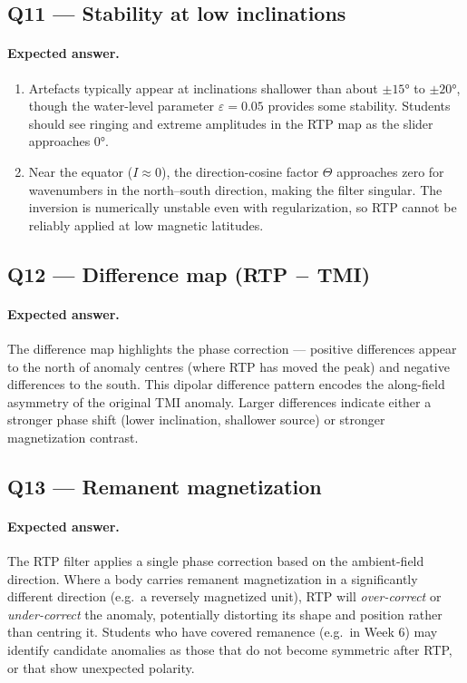 \documentclass[11pt]{article}
\begin{document}
\subsection*{Q11 — Stability at low inclinations}

\paragraph{Expected answer.}
\begin{enumerate}[label=\alph*.]
  \item Artefacts typically appear at inclinations shallower than about $\pm15°$
        to $\pm20°$, though the water-level parameter $\varepsilon = 0.05$
        provides some stability.  Students should see ringing and extreme
        amplitudes in the RTP map as the slider approaches $0°$.
  \item Near the equator ($I \approx 0$), the direction-cosine factor $\Theta$
        approaches zero for wavenumbers in the north--south direction, making the
        filter singular.  The inversion is numerically unstable even with
        regularization, so RTP cannot be reliably applied at low magnetic
        latitudes.
\end{enumerate}

\subsection*{Q12 — Difference map (RTP $-$ TMI)}

\paragraph{Expected answer.}
The difference map highlights the phase correction — positive differences appear
to the north of anomaly centres (where RTP has moved the peak) and negative
differences to the south.  This dipolar difference pattern encodes the along-field
asymmetry of the original TMI anomaly.  Larger differences indicate either a
stronger phase shift (lower inclination, shallower source) or stronger
magnetization contrast.

\subsection*{Q13 — Remanent magnetization}

\paragraph{Expected answer.}
The RTP filter applies a single phase correction based on the ambient-field
direction.  Where a body carries remanent magnetization in a significantly
different direction (e.g.\ a reversely magnetized unit), RTP will
\emph{over-correct} or \emph{under-correct} the anomaly, potentially distorting
its shape and position rather than centring it.  Students who have covered
remanence (e.g.\ in Week 6) may identify candidate anomalies as those that do
not become symmetric after RTP, or that show unexpected polarity.
\end{document}
